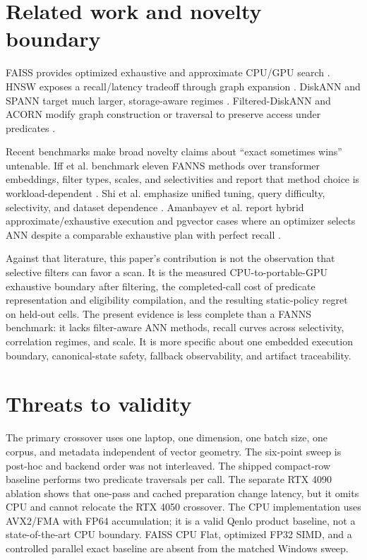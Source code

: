 \documentclass[10pt]{article}
\newcommand{\qenlo}{Qenlo}
\begin{document}
\section{Related work and novelty boundary}
FAISS provides optimized exhaustive and approximate CPU/GPU search \citep{johnson2019billion,douze2024faiss}. HNSW exposes a recall/latency tradeoff through graph expansion \citep{malkov2020hnsw}. DiskANN and SPANN target much larger, storage-aware regimes \citep{subramanya2019diskann,chen2021spann}. Filtered-DiskANN and ACORN modify graph construction or traversal to preserve access under predicates \citep{gollapudi2023filtered,patel2024acorn}.

Recent benchmarks make broad novelty claims about ``exact sometimes wins'' untenable. Iff et al. benchmark eleven FANNS methods over transformer embeddings, filter types, scales, and selectivities and report that method choice is workload-dependent \citep{iff2026fanns}. Shi et al. emphasize unified tuning, query difficulty, selectivity, and dataset dependence \citep{shi2025unified}. Amanbayev et al. report hybrid approximate/exhaustive execution and pgvector cases where an optimizer selects ANN despite a comparable exhaustive plan with perfect recall \citep{amanbayev2026systems}.

Against that literature, this paper's contribution is not the observation that selective filters can favor a scan. It is the measured CPU-to-portable-GPU exhaustive boundary after filtering, the completed-call cost of predicate representation and eligibility compilation, and the resulting static-policy regret on held-out cells. The present evidence is less complete than a FANNS benchmark: it lacks filter-aware ANN methods, recall curves across selectivity, correlation regimes, and scale. It is more specific about one embedded execution boundary, canonical-state safety, fallback observability, and artifact traceability.

\section{Threats to validity}
The primary crossover uses one laptop, one dimension, one batch size, one corpus, and metadata independent of vector geometry. The six-point sweep is post-hoc and backend order was not interleaved. The shipped compact-row baseline performs two predicate traversals per call. The separate RTX 4090 ablation shows that one-pass and cached preparation change latency, but it omits CPU and cannot relocate the RTX 4050 crossover. The CPU implementation uses AVX2/FMA with FP64 accumulation; it is a valid \qenlo{} product baseline, not a state-of-the-art CPU boundary. FAISS CPU Flat, optimized FP32 SIMD, and a controlled parallel exact baseline are absent from the matched Windows sweep.
\end{document}
